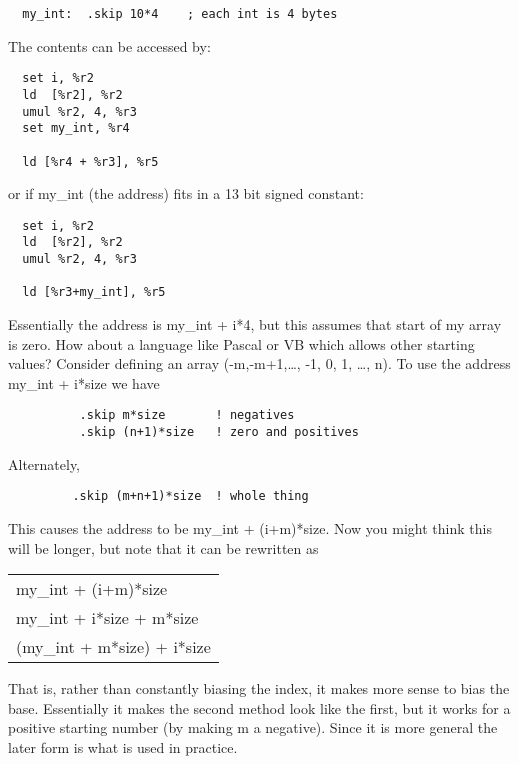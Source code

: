 \begin{verbatim}
  my_int:  .skip 10*4    ; each int is 4 bytes
\end{verbatim}

The contents can be accessed by:

\begin{verbatim}
  set i, %r2
  ld  [%r2], %r2
  umul %r2, 4, %r3
  set my_int, %r4

  ld [%r4 + %r3], %r5
\end{verbatim}

or if my\_int (the address) fits in a 13 bit signed constant:

\begin{verbatim}
  set i, %r2
  ld  [%r2], %r2
  umul %r2, 4, %r3

  ld [%r3+my_int], %r5
\end{verbatim}

Essentially the address is my\_int + i*4, but this assumes that start of my array is zero.  How about a language like Pascal or VB which allows other starting values?  Consider defining an array (-m,-m+1,\ldots, -1, 0, 1, \ldots, n).  To use the address my\_int + i*size we have

\begin{verbatim}
          .skip m*size       ! negatives
          .skip (n+1)*size   ! zero and positives
\end{verbatim}

Alternately,

\begin{verbatim}
         .skip (m+n+1)*size  ! whole thing
\end{verbatim}

This causes the address to be my\_int + (i+m)*size.  Now you might think this will be longer, but note that it can be rewritten as

\vspace{.1in}
\begin{tabular}{l}
    my\_int + (i+m)*size \\
    my\_int + i*size + m*size \\
    (my\_int + m*size) + i*size \\
\end{tabular}
\vspace{.1in}

That is, rather than constantly biasing the index, it makes more sense to bias the base.  Essentially it makes the second method look like the first, but it works for a positive starting number (by making m a negative).  Since it is more general the later form is what is used in practice.

